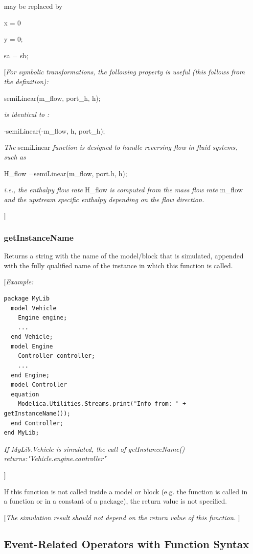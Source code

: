 \documentclass[10pt,a4paper]{report}
\def\doublelabel#1{\label{#1}\hypertarget{#1}{}}
\begin{document}
may be replaced by

x = 0

y = 0;

sa = sb;

{[}\emph{For symbolic transformations, the following property is useful
(this follows from the definition):}

semiLinear(m\_flow, port\_h, h);

\emph{is identical to :}

-semiLinear(-m\_flow, h, port\_h);

\emph{The} semiLinear \emph{function is designed to handle reversing
flow in fluid systems, such as}

H\_flow =semiLinear(m\_flow, port.h, h);

\emph{i.e., the enthalpy flow rate} H\_flow \emph{is computed from the
mass flow rate} m\_flow \emph{and the upstream specific enthalpy
depending on the flow direction. }

{]}

\subsubsection{getInstanceName}\doublelabel{getinstancename}

Returns a string with the name of the model/block that is simulated,
appended with the fully qualified name of the instance in which this
function is called.

{[}\emph{Example:}
\begin{lstlisting}[language=modelica]
package MyLib
  model Vehicle
    Engine engine;
    ...
  end Vehicle;
  model Engine
    Controller controller;
    ...
  end Engine;
  model Controller
  equation
    Modelica.Utilities.Streams.print("Info from: " + getInstanceName());
  end Controller;
end MyLib;
\end{lstlisting}

\emph{If MyLib.Vehicle is simulated, the call of getInstanceName()
returns:"Vehicle.engine.controller"}

{]}

If this function is not called inside a model or block (e.g. the
function is called in a function or in a constant of a package), the
return value is not specified.

{[}\emph{The simulation result should not depend on the return value of
this function.} {]}

\subsection{Event-Related Operators with Function Syntax}\doublelabel{event-related-operators-with-function-syntax}
\end{document}
